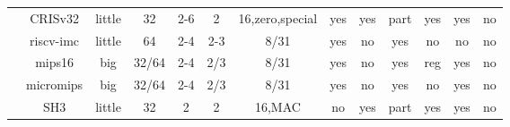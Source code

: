 \begin{sidewaystable}[tbp]
\begin{sf}
\begin{footnotesize}
\begin{center}
\begin{tabular}{|c|c||c|c|c|c|c|c|c|c|c|c|c|}
                 & %
CRISv32          & %
little           & %
32               & %
2-6              & %
2                & %
16,zero,special  & %
yes              & %
yes              & %
part             & %
yes              & %
yes              & %
no                 %
\\
\cline{2-13}

		 & %
riscv-imc        & %
little           & %
64               & %
2-4              & %
2-3              & %
8/31             & %
yes              & %
no               & %
yes              & %
no               & %
no               & %
no                 %
\\
\cline{2-13}


		 & %
mips16           & %
big              & %
32/64            & %
2-4              & %
2/3              & %
8/31             & %
yes              & %
no               & %
yes              & %
reg              & %
yes              & %
no                 %
\\
\cline{2-13}

		 & %
micromips           & %
big              & %
32/64            & %
2-4              & %
2/3              & %
8/31             & %
yes              & %
no               & %
yes              & %
no               & %
yes              & %
no                 %
\\
\cline{2-13}


                 & %
SH3              & %
little           & %
32               & %
2                & %
2                & %
16,MAC           & %
no               & %
yes              & %
part             & %
yes              & %
yes              & %
no                 %
\\
\cline{2-13}


\end{tabular}
\end{center}
\end{footnotesize}
\end{sf}
\end{sidewaystable}
